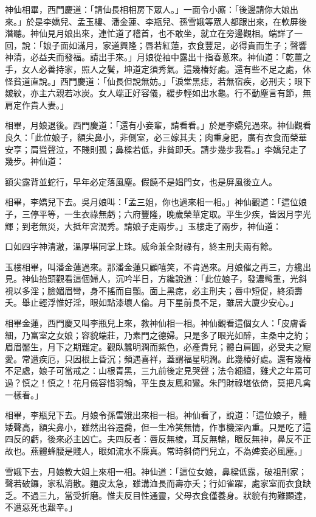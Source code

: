 神仙相畢，西門慶道：「請仙長相相房下眾人。」一面令小廝：「後邊請你大娘出來。」於是李嬌兒、孟玉樓、潘金蓮、李瓶兒、孫雪娥等眾人都跟出來，在軟屏後潛聽。神仙見月娘出來，連忙道了稽首，也不敢坐，就立在旁邊觀相。端詳了一回，說：「娘子面如滿月，家道興隆；唇若紅蓮，衣食豐足，必得貴而生子；聲響神清，必益夫而發福。請出手來。」月娘從袖中露出十指春蔥來。神仙道：「乾薑之手，女人必善持家，照人之鬢，坤道定須秀氣。這幾椿好處。還有些不足之處，休怪貧道直說。」西門慶道：「仙長但說無妨。」「淚堂黑痣，若無宿疾，必刑夫；眼下皴紋，亦主六親若冰炭。女人端正好容儀，緩步輕如出水龜。行不動塵言有節，無肩定作貴人妻。」

相畢，月娘退後。西門慶道：「還有小妾輩，請看看。」於是李嬌兒過來。神仙觀看良久：「此位娘子，額尖鼻小，非側室，必三嫁其夫；肉重身肥，廣有衣食而榮華安享；肩聳聲泣，不賤則孤；鼻樑若低，非貧即夭。請步幾步我看。」李嬌兒走了幾步。神仙道：

額尖露背並蛇行，早年必定落風塵。假饒不是娼門女，也是屏風後立人。

相畢，李嬌兒下去。吳月娘叫：「孟三姐，你也過來相一相。」神仙觀道：「這位娘子，三停平等，一生衣祿無虧；六府豐隆，晚歲榮華定取。平生少疾，皆因月孛光輝；到老無災，大抵年宮潤秀。請娘子走兩步。」玉樓走了兩步，神仙道：

口如四字神清澈，溫厚堪同掌上珠。威命兼全財祿有，終主刑夫兩有餘。

玉樓相畢，叫潘金蓮過來。那潘金蓮只顧嘻笑，不肯過來。月娘催之再三，方纔出見。神仙抬頭觀看這個婦人，沉吟半日，方纔說道：「此位娘子，發濃髩重，光斜視以多淫；臉媚眉彎，身不搖而自顫。面上黑痣，必主刑夫；唇中短促，終須壽夭。舉止輕浮惟好淫，眼如點漆壞人倫。月下星前長不足，雖居大廈少安心。」

相畢金蓮，西門慶又叫李瓶兒上來，教神仙相一相。神仙觀看這個女人：「皮膚香細，乃富室之女娘；容貌端莊，乃素門之德婦。只是多了眼光如醉，主桑中之約；眉眉靨生，月下之期難定。觀臥蠶明潤而紫色，必產貴兒；體白肩圓，必受夫之寵愛。常遭疾厄，只因根上昏沉；頻遇喜祥，蓋謂福星明潤。此幾椿好處。還有幾椿不足處，娘子可當戒之：山根青黑，三九前後定見哭聲；法令細繵，雞犬之年焉可過？慎之！慎之！花月儀容惜羽翰，平生良友鳳和鸞。朱門財祿堪依倚，莫把凡禽一樣看。」

相畢，李瓶兒下去。月娘令孫雪娥出來相一相。神仙看了，說道：「這位娘子，體矮聲高，額尖鼻小，雖然出谷遷喬，但一生冷笑無情，作事機深內重。只是吃了這四反的虧，後來必主凶亡。夫四反者：唇反無棱，耳反無輪，眼反無神，鼻反不正故也。燕體蜂腰是賤人，眼如流水不廉真。常時斜倚門兒立，不為婢妾必風塵。」

雪娥下去，月娘教大姐上來相一相。神仙道：「這位女娘，鼻樑低露，破祖刑家；聲若破鑼，家私消散。麵皮太急，雖溝洫長而壽亦夭；行如雀躍，處家室而衣食缺乏。不過三九，當受折磨。惟夫反目性通靈，父母衣食僅養身。狀貌有拘難顯達，不遭惡死也艱辛。」

